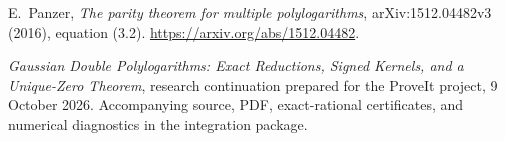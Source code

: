 E.~Panzer, \emph{The parity theorem for multiple polylogarithms},
arXiv:1512.04482v3 (2016), equation (3.2).
\url{https://arxiv.org/abs/1512.04482}.

\emph{Gaussian Double Polylogarithms: Exact Reductions, Signed Kernels,
and a Unique-Zero Theorem}, research continuation prepared for the
ProveIt project, 9 October 2026. Accompanying source, PDF, exact-rational
certificates, and numerical diagnostics in the integration package.
